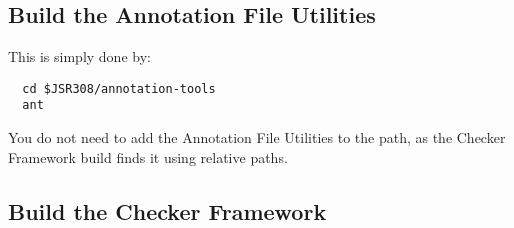 \subsection{Build the Annotation File Utilities\label{afu-building}}

This is simply done by:

\begin{Verbatim}
  cd $JSR308/annotation-tools
  ant
\end{Verbatim}

You do not need to add the Annotation File Utilities to the path, as
the Checker Framework build finds it using relative paths.


\subsection{Build the Checker Framework\label{building}}


